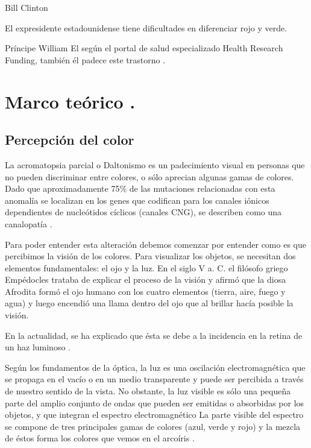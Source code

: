 \documentclass[10pt]{article}
\begin{document}
Bill Clinton

El expresidente estadounidense tiene dificultades en diferenciar rojo y verde.

\setlength{\parskip}{2mm}

Príncipe William
El según el portal de salud especializado Health Research Funding, también él padece este trastorno \cite{IEEEreferencias:Ref11}.

\section{Marco teórico .}
\subsection{Percepción del color} 

La acromatopsia parcial o Daltonismo es un padecimiento visual en personas que no pueden discriminar entre colores, o sólo aprecian algunas gamas de colores. Dado que aproximadamente 75\% de las mutaciones relacionadas con esta anomalía se localizan en los genes que codifican para los canales iónicos dependientes de nucleótidos cíclicos (canales CNG), se describen como una canalopatía \cite{IEEEreferencias:Ref12}.

\setlength{\parskip}{2mm}

Para poder entender esta alteración debemos comenzar por entender como es que percibimos la visión de los colores.
Para visualizar los objetos, se necesitan dos elementos fundamentales: el ojo y la luz. En el siglo V a. C. el filósofo griego Empédocles trataba de explicar el proceso de la visión y afirmó que la diosa Afrodita formó el ojo humano con los cuatro elementos (tierra, aire, fuego y agua) y luego encendió una llama dentro del ojo que al brillar hacía posible la visión.

\setlength{\parskip}{2mm}

En la actualidad, se ha explicado que ésta se debe a la incidencia en la retina de un haz luminoso \cite{IEEEreferencias:Ref13}.

\setlength{\parskip}{2mm}

Según los fundamentos de la óptica, la luz es una oscilación electromagnética que se propaga en el vacío o en un medio transparente y puede ser percibida a través de nuestro sentido de la vista. No obstante, la luz visible es sólo una pequeña parte del amplio conjunto de ondas que pueden ser emitidas o absorbidas por los objetos, y que integran el espectro electromagnético La parte visible del espectro se compone de tres principales gamas de colores (azul, verde y rojo) y la mezcla de éstos forma los colores que vemos en el arcoíris \cite{IEEEreferencias:Ref12}.
\end{document}
